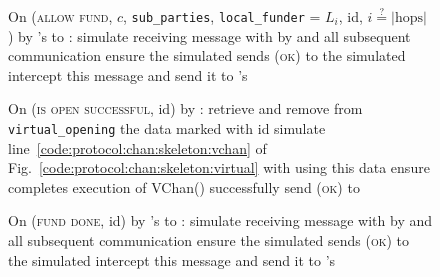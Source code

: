 \begin{figure}[H]
\begin{simulatorbox}{\simulator}
\begin{algorithmic}[1]
      \State On (\textsc{allow fund}, $c$, \texttt{sub\_parties},
      \texttt{local\_funder} = $L_i$, id, $i \overset{?}{=} |\mathrm{hops}|$) by
      \fchan's \alice to \charlie:
      \Indent
        \State simulate receiving message with \charlie by \alice and all
        subsequent communication
        \State ensure the simulated \charlie sends (\textsc{ok}) to the
        simulated \alice
        \State intercept this message and send it to \fchan's \alice
      \EndIndent
      \Statex

      \State On (\textsc{is open successful}, id) by \fchan:
      \Indent
        \State retrieve and remove from \texttt{virtual\_opening} the data
        marked with id
        \State simulate line~\ref{code:protocol:chan:skeleton:vchan} of
        Fig.~\ref{code:protocol:chan:skeleton:virtual} with \alice using this
        data
        \State ensure \alice completes execution of VChan() successfully
        \State send (\textsc{ok}) to \fchan
      \EndIndent
      \Statex

      \State On (\textsc{fund done}, id) by \fchan's \alice to \charlie:
      \Indent
        \State simulate receiving message with \charlie by \alice and all
        subsequent communication
        \State ensure the simulated \charlie sends (\textsc{ok}) to the
        simulated \alice
        \State intercept this message and send it to \fchan's \alice
      \EndIndent
    \end{algorithmic}
  \end{simulatorbox}
  \caption{}
  \label{code:simulator}
\end{figure}
